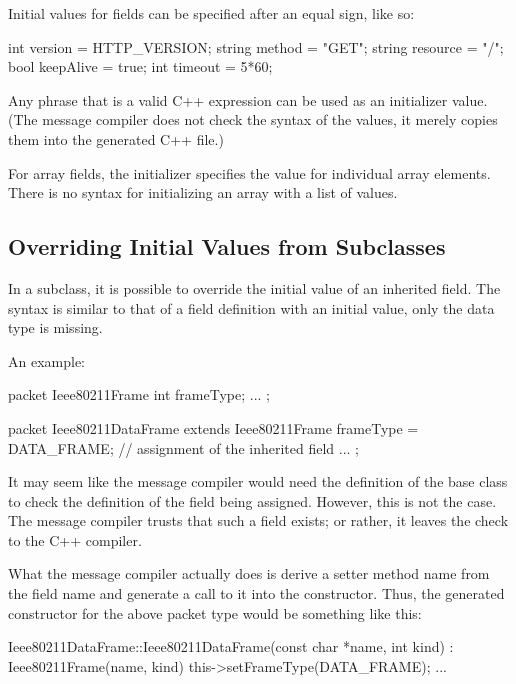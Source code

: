 Initial values for fields can be specified after an equal sign, like so:

\begin{msg}
int version = HTTP_VERSION;
string method = "GET";
string resource = "/";
bool keepAlive = true;
int timeout = 5*60;
\end{msg}

Any phrase that is a valid C++ expression can be used as an initializer value.
(The message compiler does not check the syntax of the values, it merely copies
them into the generated C++ file.)

For array fields, the initializer specifies the value for individual array
elements. There is no syntax for initializing an array with a list of values.


\subsection{Overriding Initial Values from Subclasses}
\label{sec:msg-defs:assignment-of-inherited-fields}

In a subclass, it is possible to override the initial value of an inherited
field. The syntax is similar to that of a field definition with an initial
value, only the data type is missing.

An example:

\begin{msg}
packet Ieee80211Frame
{
    int frameType;
    ...
};

packet Ieee80211DataFrame extends Ieee80211Frame
{
    frameType = DATA_FRAME;  // assignment of the inherited field
    ...
};
\end{msg}

It may seem like the message compiler would need the definition of the base
class to check the definition of the field being assigned. However, this is not
the case. The message compiler trusts that such a field exists; or rather, it
leaves the check to the C++ compiler.

What the message compiler actually does is derive a setter method name from the
field name and generate a call to it into the constructor. Thus, the generated
constructor for the above packet type would be something like this:

\begin{cpp}
Ieee80211DataFrame::Ieee80211DataFrame(const char *name, int kind) :
    Ieee80211Frame(name, kind)
{
    this->setFrameType(DATA_FRAME);
    ...
}
\end{cpp}


